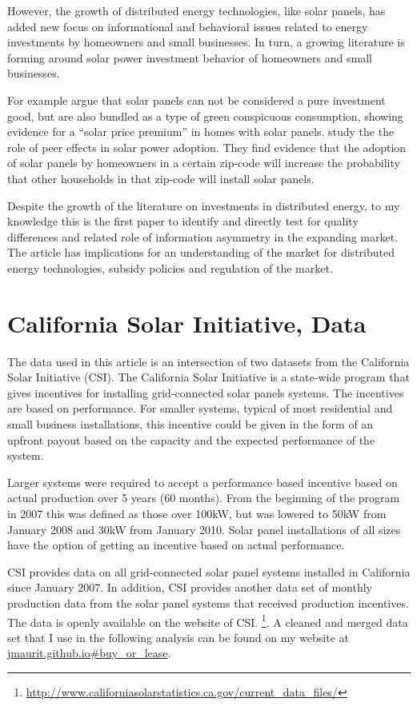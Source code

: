 \documentclass[a4paper]{article}
\begin{document}
However, the growth of distributed energy technologies, like solar panels, has added new focus on informational and behavioral issues related to energy investments by homeowners and small businesses. In turn, a growing literature is forming around solar power investment behavior of homeowners and small businesses.

For example \citet{dastrup_understanding_2012} argue that solar panels can not be considered a pure investment good, but are also bundled as a type of green conspicuous consumption, showing evidence for a ``solar price premium'' in homes with solar panels. \citet{bollinger_peer_2012} study the the role of peer effects in solar power adoption. They find evidence that the adoption of solar panels by homeowners in a certain zip-code will increase the probability that other households in that zip-code will install solar panels.

Despite the growth of the literature on investments in distributed energy, to my knowledge this is the first paper to identify and directly test for quality differences and related role of information asymmetry in the expanding market. The article has implications for an understanding of the market for distributed energy technologies, subsidy policies and regulation of the market.

\section{California Solar Initiative, Data}

The data used in this article is an intersection of two datasets from the California Solar Initiative (CSI). The California Solar Initiative is a state-wide program that gives incentives for installing grid-connected solar panels systems. The incentives are based on performance. For smaller systems, typical of most residential and small business installations, this incentive could be given in the form of an upfront payout based on the capacity and the expected performance of the system.

Larger systems were required to accept a performance based incentive based on actual production over 5 years (60 months). From the beginning of the program in 2007 this was defined as those over 100kW, but was lowered to 50kW from January 2008 and 30kW from January 2010. Solar panel installations of all sizes have the option of getting an incentive based on actual performance.

CSI provides data on all grid-connected solar panel systems installed in California since January 2007. In addition, CSI provides another data set of monthly production data from the solar panel systems that received production incentives. The data is openly available on the website of CSI. \footnote{\url{http://www.californiasolarstatistics.ca.gov/current_data_files/}}. A cleaned and merged data set that I use in the following analysis can be found on my website at \url{jmaurit.github.io#buy_or_lease}.
\end{document}
